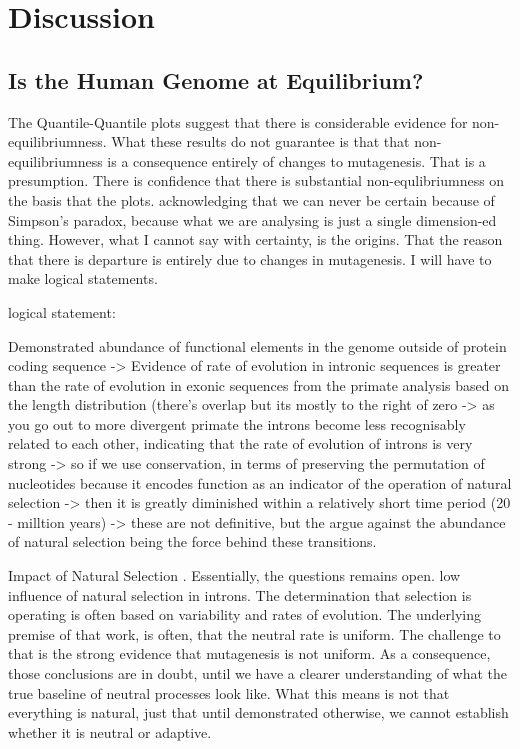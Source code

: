 \chapter{Discussion}

\section{Is the Human Genome at Equilibrium?}



The Quantile-Quantile plots suggest that there is considerable evidence for non-equilibriumness. What these results do not guarantee is that that non-equilibriumness is a consequence entirely of changes to mutagenesis. That is a presumption. There is confidence that there is substantial non-equlibriumness on the basis that the plots. acknowledging that we can never be certain because of Simpson's paradox, because what we are analysing is just a single dimension-ed thing. However, what I cannot say with certainty, is the origins. That the reason that there is departure is entirely due to changes in mutagenesis. I will have to make logical statements. 

logical statement: 

Demonstrated abundance of functional elements in the genome outside of protein coding sequence -> Evidence of rate of evolution in intronic sequences is greater than the rate of evolution in exonic sequences from the primate analysis based on the length distribution (there's overlap but its mostly to the right of zero -> as you go out to more divergent primate the introns become less recognisably related to each other, indicating that the rate of evolution of introns is very strong -> so if we use conservation, in terms of preserving the permutation of nucleotides because it encodes function as an indicator of the operation of natural selection -> then it is greatly diminished within a relatively short time period (20 - milltion years) -> these are not definitive, but the argue against the abundance of natural selection being the force behind these transitions.

Impact of Natural Selection \cite{Graur2013OnENCODE}. Essentially, the questions remains open. 
low influence of natural selection in introns. 
The determination that selection is operating is often based on variability and rates of evolution. The underlying premise of that work, is often, that the neutral rate is uniform. The challenge to that is the strong evidence that mutagenesis is not uniform. As a consequence, those conclusions are in doubt, until we have a clearer understanding of what the true baseline of neutral processes look like. What this means is not that everything is natural, just that until demonstrated otherwise, we cannot establish whether it is neutral or adaptive. 



